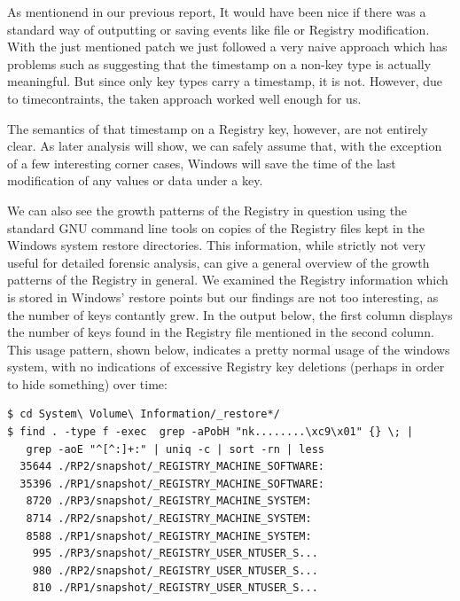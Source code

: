 \documentclass[a4paper,
    11pt,
    normalheadings,
    parindent,
    UKenglish,
    abstracton,
    ]{scrartcl}
\begin{document}
As mentionend in our previous report, It would have been nice if there was a standard way of outputting or saving events like file or Registry modification.
With the just mentioned patch we just followed a very naive approach which has problems such as suggesting that the timestamp on a non-key type is actually meaningful.
But since only key types carry a timestamp, it is not.
However, due to timecontraints, the taken approach worked well enough for us.


The semantics of that timestamp on a Registry key, however, are not entirely clear.
As later analysis will show, we can safely assume that, with the exception of a few interesting corner cases, Windows will save the time of the last modification of any values or data under a key.

We can also see the growth patterns of the Registry in question using the standard GNU command line tools on copies of the Registry files kept in the Windows system restore directories.
This information, while strictly not very useful for detailed forensic analysis, can give a general overview of the growth patterns of the Registry in general.
We examined the Registry information which is stored in Windows' restore points but our findings are not too interesting, as the number of keys contantly grew.
In the output below, the first column displays the number of keys found in the Registry file mentioned in the second column.
This usage pattern, shown below, indicates a pretty normal usage of the windows system, with no indications of excessive Registry key deletions (perhaps in order to hide something) over time:
\begin{verbatim}
$ cd System\ Volume\ Information/_restore*/
$ find . -type f -exec  grep -aPobH "nk........\xc9\x01" {} \; |
   grep -aoE "^[^:]+:" | uniq -c | sort -rn | less
  35644 ./RP2/snapshot/_REGISTRY_MACHINE_SOFTWARE:
  35396 ./RP1/snapshot/_REGISTRY_MACHINE_SOFTWARE:
   8720 ./RP3/snapshot/_REGISTRY_MACHINE_SYSTEM:
   8714 ./RP2/snapshot/_REGISTRY_MACHINE_SYSTEM:
   8588 ./RP1/snapshot/_REGISTRY_MACHINE_SYSTEM:
    995 ./RP3/snapshot/_REGISTRY_USER_NTUSER_S...
    980 ./RP2/snapshot/_REGISTRY_USER_NTUSER_S...
    810 ./RP1/snapshot/_REGISTRY_USER_NTUSER_S...
\end{verbatim}
\end{document}
